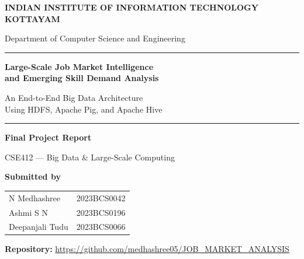 \documentclass[10pt,a4paper]{article}
\begin{document}
\begin{titlepage}
\thispagestyle{empty}
\centering
\vspace*{1cm}
{\large\bfseries INDIAN INSTITUTE OF INFORMATION TECHNOLOGY KOTTAYAM\par}
\vspace{0.4cm}
{\normalsize Department of Computer Science and Engineering\par}
\vspace{1.5cm}
\rule{\textwidth}{1.2pt}\par
\vspace{0.6cm}
{\Huge\bfseries Large-Scale Job Market Intelligence\\and Emerging Skill Demand Analysis\par}
\vspace{0.6cm}
{\Large An End-to-End Big Data Architecture\\Using HDFS, Apache Pig, and Apache Hive\par}
\vspace{0.6cm}
\rule{\textwidth}{1.2pt}\par
\vspace{1.5cm}
{\large\bfseries Final Project Report\par}
\vspace{0.3cm}
{\large CSE412 --- Big Data \& Large-Scale Computing\par}
\vspace{1.8cm}

{\large\bfseries Submitted by\par}
\vspace{0.4cm}
\begin{tabular}{lr}
N Medhashree & 2023BCS0042 \\
Ashmi S N & 2023BCS0196 \\
Deepanjali Tudu & 2023BCS0066 \\
\end{tabular}

\vspace{1.5cm}
{\normalsize\textbf{Repository:} \url{https://github.com/medhashree05/JOB_MARKET_ANALYSIS}\par}
\vspace{0.3cm}

\vfill
\end{titlepage}


\end{document}
